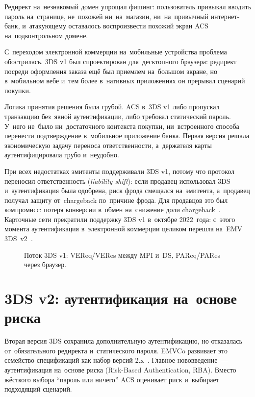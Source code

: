 Редирект на~незнакомый домен упрощал фишинг: пользователь привыкал
вводить пароль на~странице, не~похожей ни~на~магазин, ни~на~привычный
интернет-банк, и~атакующему оставалось воспроизвести похожий экран ACS
на~подконтрольном домене.

С~переходом электронной коммерции на~мобильные устройства проблема обострилась.
3DS v1 был спроектирован для~десктопного браузера: редирект посреди оформления
заказа ещё был приемлем на~большом экране, но в~мобильном вебе и~тем
более в~нативных приложениях он прерывал сценарий покупки.

Логика принятия решения была грубой. ACS в~3DS v1 либо пропускал транзакцию без~явной аутентификации, либо требовал статический пароль. У~него не~было ни~достаточного контекста
покупки, ни~встроенного способа перенести подтверждение в~мобильное приложение
банка. Первая версия решала экономическую задачу переноса ответственности,
а~держателя карты аутентифицировала грубо и~неудобно.

При всех недостатках эмитенты поддерживали 3DS v1, потому что протокол переносил
ответственность (\textit{liability shift}): если продавец использовал 3DS
и~аутентификация была одобрена, риск фрода смещался на~эмитента,
а~продавец получал защиту от~chargeback по~причине фрода. Для продавцов это был
компромисс: потеря конверсии в~обмен на~снижение доли
chargeback~\cite{emvco-3ds-whitepaper}. Карточные сети прекратили поддержку 3DS v1
в~октябре 2022~года: с~этого момента аутентификация в~электронной коммерции целиком
перешла на~EMV 3DS~v2~\cite{visa-3ds1-sunset-2022}.

\begin{figure}[htbp]
  \centering
  \caption{Поток 3DS v1: VEReq/VERes между MPI и~DS, PAReq/PARes через браузер.}\label{fig:3ds-v1-flow}
\end{figure}

\FloatBarrier
\section{3DS v2: аутентификация на~основе риска}\label{sec:3ds-v2}

Вторая версия 3DS сохранила дополнительную аутентификацию, но отказалась
от~обязательного редиректа и~статического пароля. EMVCo развивает это семейство
спецификаций как набор версий 2.x~\cite{emvco-3ds-whitepaper}. Главное
нововведение~--- аутентификация на~основе риска (Risk-Based Authentication,
RBA). Вместо жёсткого выбора \enquote{пароль или ничего} ACS оценивает риск
и~выбирает подходящий сценарий.

